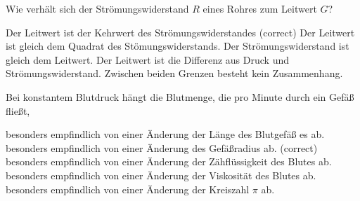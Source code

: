 \documentclass[11pt]{exam}
\begin{document}
\begin{questions}
\vspace{3mm}\question Wie verhält sich der Strömungswiderstand \(R\) eines Rohres zum Leitwert \(G\)?

\begin{choices}
	\choice Der Leitwert ist der Kehrwert des Strömungswiderstandes (correct)
	\choice Der Leitwert ist gleich dem Quadrat des Stömungswiderstands.
	\choice Der Strömungswiderstand ist gleich dem Leitwert.
	\choice Der Leitwert ist die Differenz aus Druck und Strömungswiderstand.
	\choice Zwischen beiden Grenzen besteht kein Zusammenhang.
\end{choices}

\vspace{3mm}\question Bei konstantem Blutdruck hängt die Blutmenge, die pro Minute durch ein Gefäß fließt,

\begin{choices}
	\choice besonders empfindlich von einer Änderung der Länge des Blutgefäß es ab.
	\choice besonders empfindlich von einer Änderung des Gefäßradius ab. (correct)
	\choice besonders empfindlich von einer Änderung der Zähflüssigkeit des Blutes ab.
	\choice besonders empfindlich von einer Änderung der Viskosität des Blutes ab.
	\choice besonders empfindlich von einer Änderung der Kreiszahl \(\pi\) ab.
\end{choices}

\vspace{3mm}\end{questions}
\end{document}
